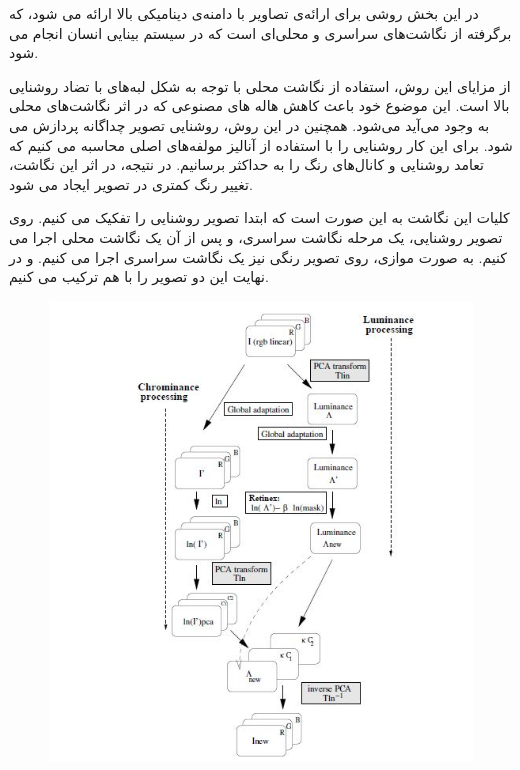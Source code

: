 در این بخش روشی برای ارائه‌ی تصاویر با دامنه‌ی دینامیکی بالا ارائه می شود، که برگرفته از نگاشت‌های سراسری و محلی‌ای است که در سیستم بینایی انسان انجام می شود. 

از مزایای این روش، استفاده از نگاشت محلی با توجه به شکل لبه‌های با تضاد روشنایی بالا است. این موضوع خود باعث کاهش هاله های مصنوعی که در اثر نگاشت‌های محلی به وجود می‌آید می‌شود.
همچنین در این روش،  روشنایی تصویر  چداگانه پردازش می شود. برای این کار روشنایی را با استفاده از آنالیز مولفه‌های اصلی محاسبه می کنیم که تعامد روشنایی و کانال‌های رنگ را به حداکثر برسانیم. در نتیجه، در اثر این نگاشت، تغییر رنگ کمتری در تصویر ایجاد می شود.

کلیات این نگاشت به این صورت است که ابتدا تصویر روشنایی را تفکیک می کنیم. روی تصویر روشنایی، یک مرحله نگاشت سراسری، و پس از آن یک نگاشت محلی اجرا می کنیم. به صورت موازی، روی تصویر رنگی نیز یک نگاشت سراسری اجرا می کنیم. و در نهایت این دو تصویر را با هم ترکیب می کنیم.
\begin{figure}[!htb]
	\includegraphics[width=\linewidth]{images/retinexbigpic}
	\caption{}\label{fig:logtonemap}
	\endminipage\hfill
\end{figure}

